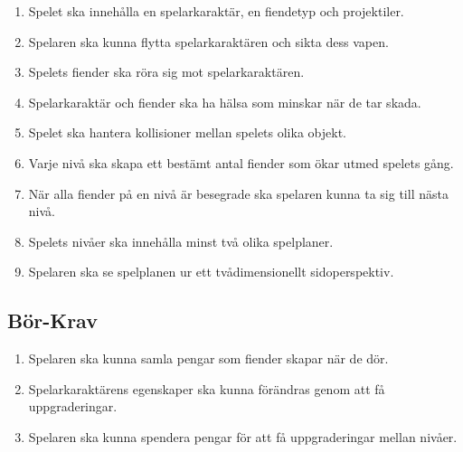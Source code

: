 \documentclass{TDP005mall}
\begin{document}
\begin{enumerate}
\item Spelet ska innehålla en spelarkaraktär, en fiendetyp och projektiler.
\item Spelaren ska kunna flytta spelarkaraktären och sikta dess vapen. 
\item Spelets fiender ska röra sig mot spelarkaraktären.
\item Spelarkaraktär och fiender ska ha hälsa som minskar när de tar skada.
\item Spelet ska hantera kollisioner mellan spelets olika objekt.
\item Varje nivå ska skapa ett bestämt antal fiender som ökar utmed spelets gång.
\item När alla fiender på en nivå är besegrade ska spelaren kunna ta sig till nästa nivå. 
\item Spelets nivåer ska innehålla minst två olika spelplaner.
\item Spelaren ska se spelplanen ur ett tvådimensionellt sidoperspektiv.
\end{enumerate}

\subsection{Bör-Krav}
\begin{enumerate}
\item Spelaren ska kunna samla pengar som fiender skapar när de dör.
\item Spelarkaraktärens egenskaper ska kunna förändras genom att få uppgraderingar. 
\item Spelaren ska kunna spendera pengar för att få uppgraderingar mellan nivåer.
\end{enumerate}
\end{document}
